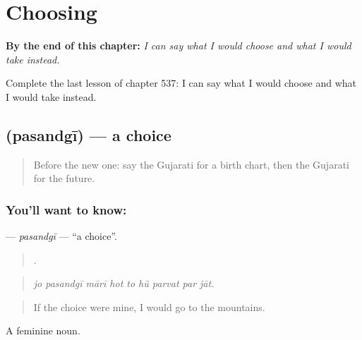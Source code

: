 
\chapter{Choosing}
\label{ch:gu-choosing}

\begin{chapteropening}
\textbf{By the end of this chapter:} \emph{I can say what I would choose and what I would take instead.}

Complete the last lesson of chapter 537: I can say what I would choose and what I would take instead.
\end{chapteropening}

\section[\texorpdfstring{\gu{પસંદગી} (pasandgī)}{પસંદગી (pasandgī)}]{ (pasandgī) — a choice}

\label{lesson:GU-C537-pasandgi}



\begin{quote}
Before the new one: say the Gujarati for a birth chart, then the Gujarati for the future.
\end{quote}

\subsection*{You'll want to know: }
\textbf{} — \emph{pasandgī} — \textquotedblleft{}a choice\textquotedblright{}.

\begin{quote}
        .
\end{quote}

\begin{quote}
\emph{jo pasandgī mārī hot to hũ parvat par jāt.}
\end{quote}

\begin{quote}
If the choice were mine, I would go to the mountains.
\end{quote}

A feminine noun.

